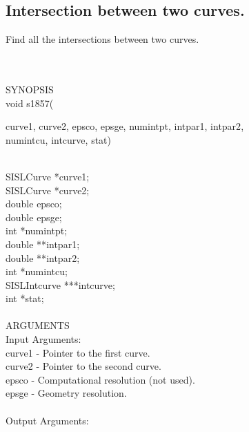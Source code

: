 \subsection{\sloppy Intersection between two curves.}
\begin{minipg1}
  Find all the intersections between two curves.
\end{minipg1} \\ \\
SYNOPSIS\\
        \>void s1857(\begin{minipg3}
        {\fov curve1}, {\fov curve2}, {\fov epsco}, {\fov epsge}, {\fov numintpt},
        {\fov intpar1}, {\fov intpar2}, {\fov \\numintcu}, {\fov intcurve}, {\fov stat})
                \end{minipg3}\\[0.3ex]
                \>\>    SISLCurve       \>      *{\fov curve1};\\
                \>\>    SISLCurve       \>      *{\fov curve2};\\
                \>\>    double  \>      {\fov epsco};\\
                \>\>    double  \>      {\fov epsge};\\
                \>\>    int     \>      *{\fov numintpt};\\
                \>\>    double  \>      **{\fov intpar1};\\
                \>\>    double  \>      **{\fov intpar2};\\
                \>\>    int     \>      *{\fov numintcu};\\
                \>\>    SISLIntcurve \> ***{\fov intcurve};\\
                \>\>    int     \>      *{\fov stat};\\
\\
ARGUMENTS\\
        \>Input Arguments:\\
        \>\>    {\fov curve1}   \> - \> Pointer to the first curve.\\
        \>\>    {\fov curve2}   \> - \> Pointer to the second curve.\\
        \>\>    {\fov epsco}    \> - \> Computational resolution (not used).\\
        \>\>    {\fov epsge}    \> - \> Geometry resolution.\\
\\
        \>Output Arguments:\\
